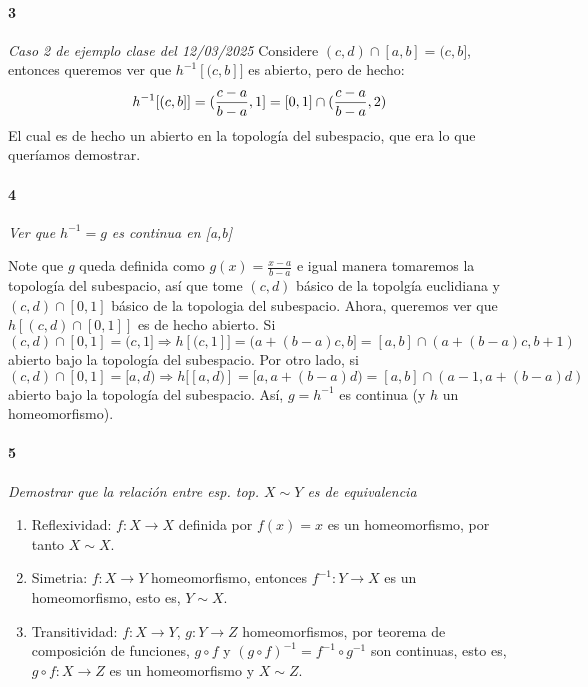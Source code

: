 \documentclass[12pt]{article}
\begin{document}
\paragraph{3}
\textit{Caso 2 de ejemplo clase del 12/03/2025} 
Considere $(c,d) \cap [a, b] = (c,b]$, entonces queremos ver que $h^{-1}[(c,b]]$ es abierto, pero de hecho:
\begin{equation}
    h^{-1}[(c,b]] = (\frac{c-a}{b-a}, 1] \\
    = [0,1] \cap (\frac{c-a}{b-a}, 2)
\end{equation}
El cual es de hecho un abierto en la topología del subespacio, que era lo que queríamos demostrar.

\paragraph{4}
\textit{Ver que $h^{-1}=g$ es continua en [a,b]}

Note que $g$ queda definida como $g(x) = \frac{x-a}{b-a}$ e igual manera tomaremos la topología del subespacio, así que tome $(c,d)$ básico de la topolgía euclidiana y $(c,d) \cap [0,1]$ básico de la topologia del subespacio.
Ahora, queremos ver que $h[(c,d) \cap [0,1]]$ es de hecho abierto. Si $(c,d) \cap [0,1] = (c,1] \Rightarrow h[(c,1]] = (a+(b-a)c, b] = [a,b] \cap (a+(b-a)c, b +1)$ abierto bajo la topología del subespacio.
Por otro lado, si $(c,d) \cap [0,1] = [a,d) \Rightarrow h[[a,d)] = [a, a +(b-a)d) = [a,b] \cap (a-1, a +(b-a)d)$ abierto bajo la topología del subespacio.
Así, $g = h^{-1}$ es continua (y $h$ un homeomorfismo).

\paragraph{5}
\textit{Demostrar que la relación entre esp. top. $X\sim Y$ es de equivalencia}

\begin{enumerate}
    \item Reflexividad: $f:X \to X$ definida por $f(x)=x$ es un homeomorfismo, por tanto $X \sim X$.
    \item Simetria: $f:X \to Y$ homeomorfismo, entonces $f^{-1}: Y \to X$ es un homeomorfismo, esto es, $Y \sim X$.
    \item Transitividad: $f:X \to Y$, $g:Y\to Z$ homeomorfismos, por teorema de composición de funciones, $g\circ f$ y $(g\circ f)^{-1}=f^{-1}\circ g^{-1}$ son continuas, esto es, $g\circ f:X \to Z$ es un homeomorfismo y $X \sim Z$.
\end{enumerate}
\end{document}
